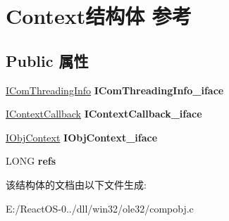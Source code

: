 \hypertarget{struct_context}{}\section{Context结构体 参考}
\label{struct_context}
\subsection*{Public 属性}
\begin{DoxyCompactItemize}
\item 
\mbox{\label{struct_context_a3d29fc9f31258f33951ae73117a10833}} 
\hyperlink{interface_i_com_threading_info}{I\+Com\+Threading\+Info} {\bfseries I\+Com\+Threading\+Info\+\_\+iface}
\item 
\mbox{\label{struct_context_a584c007347f786b5eec2aa473ac3aea9}} 
\hyperlink{interface_i_context_callback}{I\+Context\+Callback} {\bfseries I\+Context\+Callback\+\_\+iface}
\item 
\mbox{\label{struct_context_af00fe87ffb5be767768dbb08fac2b06f}} 
\hyperlink{interface_i_obj_context}{I\+Obj\+Context} {\bfseries I\+Obj\+Context\+\_\+iface}
\item 
\mbox{\label{struct_context_a984487b6f56a3712d165ee572861f672}} 
L\+O\+NG {\bfseries refs}
\end{DoxyCompactItemize}


该结构体的文档由以下文件生成\+:\begin{DoxyCompactItemize}
\item 
E\+:/\+React\+O\+S-\/0../dll/win32/ole32/compobj.\+c\end{DoxyCompactItemize}
